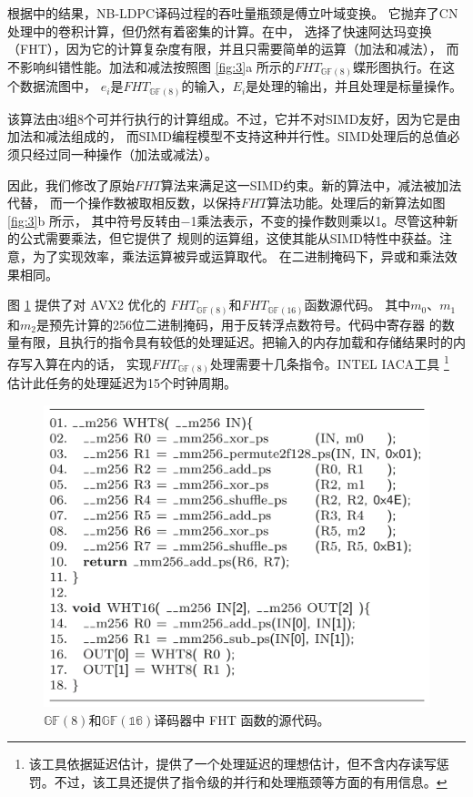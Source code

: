 \documentclass{cjc}
\begin{document}
  根据\cite{noauthor_andrade_nodate}中的结果，NB-LDPC译码过程的吞吐量瓶颈是傅立叶域变换。
  它抛弃了CN处理中的卷积计算，但仍然有着密集的计算。在\cite{noauthor_andrade_nodate}中，
  选择了快速阿达玛变换（FHT），因为它的计算复杂度有限，并且只需要简单的运算（加法和减法），
  而不影响纠错性能。加法和减法按照图 \ref{fig:3}a 所示的$FHT_{\mathbb{GF}(8)}$蝶形图执行。在这个数据流图中，
  $e_i$是$FHT_{\mathbb{GF}(8)}$的输入，$E_i$是处理的输出，并且处理是标量操作。

  该算法由3组8个可并行执行的计算组成。不过，它并不对SIMD友好，因为它是由加法和减法组成的，
  而SIMD编程模型不支持这种并行性。SIMD处理后的总值必须只经过同一种操作（加法或减法）。

  因此，我们修改了原始$FHT$算法来满足这一SIMD约束。新的算法中，减法被加法代替，
  而一个操作数被取相反数，以保持$FHT$算法功能。处理后的新算法如图 \ref{fig:3}b 所示，
  其中符号反转由−1乘法表示，不变的操作数则乘以1。尽管这种新的公式需要乘法，但它提供了
  规则的运算组，这使其能从SIMD特性中获益。注意，为了实现效率，乘法运算被异或运算取代。
  在二进制掩码下，异或和乘法效果相同。

  图 \ref{fig:4} 提供了对 AVX2 优化的 $FHT_{\mathbb{GF}(8)}$和$FHT_{\mathbb{GF}(16)}$函数源代码。
  其中$m_0$、$m_1$和$m_2$是预先计算的256位二进制掩码，用于反转浮点数符号。代码中寄存器
  的数量有限，且执行的指令具有较低的处理延迟。把输入的内存加载和存储结果时的内存写入算在内的话，
  实现$FHT_{\mathbb{GF}(8)}$处理需要十几条指令。INTEL IACA工具
  \footnote{该工具依据延迟估计，提供了一个处理延迟的理想估计，但不含内存读写惩罚。不过，该工具还提供了指令级的并行和处理瓶颈等方面的有用信息。}
  估计此任务的处理延迟为15个时钟周期。

\begin{figure}
  \includegraphics[width=\linewidth]{assets/fig4.png}
  \caption{
    $\mathbb{GF}(8)$和$\mathbb{GF(16)}$译码器中 FHT 函数的源代码。
  }\label{fig:4}
\end{figure}
\end{document}
